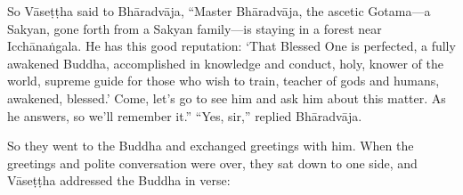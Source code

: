 \documentclass[12pt,openany]{book}%
\begin{document}
So \textsanskrit{Vāseṭṭha} said to \textsanskrit{Bhāradvāja}, “Master \textsanskrit{Bhāradvāja}, the ascetic Gotama—a Sakyan, gone forth from a Sakyan family—is staying in a forest near \textsanskrit{Icchānaṅgala}. He has this good reputation: ‘That Blessed One is perfected, a fully awakened Buddha, accomplished in knowledge and conduct, holy, knower of the world, supreme guide for those who wish to train, teacher of gods and humans, awakened, blessed.’ Come, let’s go to see him and ask him about this matter. As he answers, so we’ll remember it.” “Yes, sir,” replied \textsanskrit{Bhāradvāja}. 

So they went to the Buddha and exchanged greetings with him. When the greetings and polite conversation were over, they sat down to one side, and \textsanskrit{Vāseṭṭha} addressed the Buddha in verse: 
\end{document}
